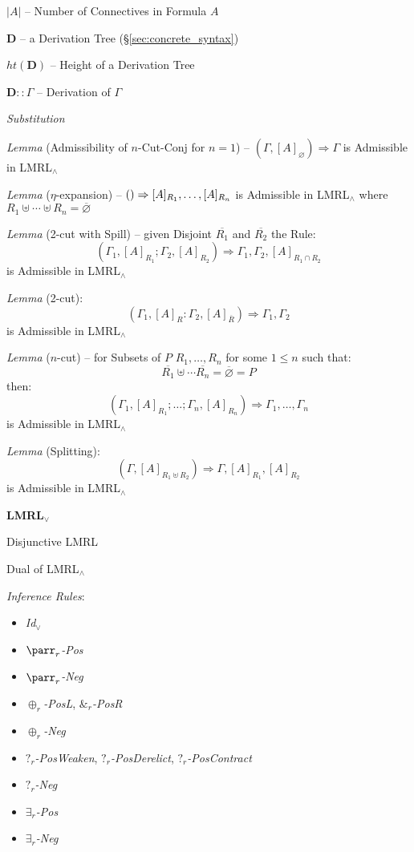 $|A|$ -- Number of Connectives in Formula $A$

$\mathbf{D}$ -- a Derivation Tree (\S\ref{sec:concrete_syntax})

$ht(\mathbf{D})$ -- Height of a Derivation Tree

$\mathbf{D} :: \Gamma$ -- Derivation of $\Gamma$

\emph{Substitution} %

\emph{Lemma} (Admissibility of $n$-Cut-Conj for $n = 1$) -- $(\Gamma,
     [A]_\varnothing) \Rightarrow \Gamma$ is Admissible in
     LMRL$_\wedge$

\emph{Lemma} ($\eta$-expansion) -- $\mathsf{()} \Rightarrow [A]_{R_1}, \ldots,
     [A]_{R_n}$ is Admissible in LMRL$_\wedge$ where $R_1 \uplus
     \cdots \uplus R_n = \overline{\varnothing}$

\emph{Lemma} (2-cut with Spill) -- given Disjoint $\overline{R_1}$ and
$\overline{R_2}$ the Rule:
\[
  (\Gamma_1, [A]_{R_1}; \Gamma_2,[A]_{R_2}) \Rightarrow
    \Gamma_1, \Gamma_2, [A]_{R_1 \cap R_2}
\]
is Admissible in LMRL$_\wedge$

\emph{Lemma} (2-cut):
\[
  (\Gamma_1, [A]_R : \Gamma_2, [A]_{\overline{R}})
    \Rightarrow \Gamma_1,\Gamma_2
\]
is Admissible in LMRL$_\wedge$

\emph{Lemma} ($n$-cut) -- for Subsets of $P$ $R_1,\ldots,R_n$ for some
$1 \leq n$ such that:
\[
  \overline{R_1} \uplus \cdots \overline{R_n} = \overline{\varnothing}
    = P
\]
then:
\[
  (\Gamma_1,[A]_{R_1}; \ldots; \Gamma_n,[A]_{R_n})
    \Rightarrow \Gamma_1, \ldots, \Gamma_n
\]
is Admissible in LMRL$_\wedge$

\emph{Lemma} (Splitting):
\[
  (\Gamma,[A]_{R_1 \uplus R_2}) \Rightarrow \Gamma,[A]_{R_1},[A]_{R_2}
\]
is Admissible in LMRL$_\wedge$


\textbf{LMRL$_\vee$}

Disjunctive LMRL

Dual of LMRL$_\wedge$

\emph{Inference Rules}:
\begin{itemize}
  \item \emph{Id$_\vee$}
  \item \emph{$\parr_r$-Pos}
  \item \emph{$\parr_r$-Neg}
  \item \emph{$\oplus_r$-PosL}, \emph{$\&_r$-PosR}
  \item \emph{$\oplus_r$-Neg}
  \item \emph{$?_r$-PosWeaken}, \emph{$?_r$-PosDerelict},
    \emph{$?_r$-PosContract}
  \item \emph{$?_r$-Neg}
  \item \emph{$\exists_r$-Pos}
  \item \emph{$\exists_r$-Neg}
\end{itemize}


